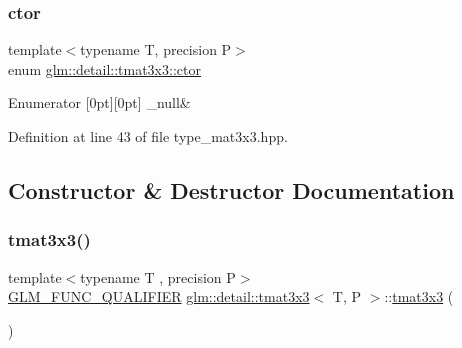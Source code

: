 \subsubsection{\texorpdfstring{ctor}{ctor}}
{\footnotesize\ttfamily template$<$typename T, precision P$>$ \\
enum \hyperlink{structglm_1_1detail_1_1tmat3x3_a24175afa829b47d3cc2a65860b16e103}{glm\+::detail\+::tmat3x3\+::ctor}}

\begin{DoxyEnumFields}{Enumerator}
[0pt][0pt]{}\mbox{\label{structglm_1_1detail_1_1tmat3x3_a24175afa829b47d3cc2a65860b16e103a4b892e336bd2984e872ade90b1464f96}} 
\+\_\+null&\\
\hline

\end{DoxyEnumFields}


Definition at line 43 of file type\+\_\+mat3x3.\+hpp.



\subsection{Constructor \& Destructor Documentation}
\mbox{\label{structglm_1_1detail_1_1tmat3x3_aec60b37bc72ea2b4f90810110b88a0d6}} 
\subsubsection{\texorpdfstring{tmat3x3()}{tmat3x3()}\hspace{0.1cm}{\footnotesize\ttfamily [1/22]}}
{\footnotesize\ttfamily template$<$typename T , precision P$>$ \\
\hyperlink{setup_8hpp_a33fdea6f91c5f834105f7415e2a64407}{G\+L\+M\+\_\+\+F\+U\+N\+C\+\_\+\+Q\+U\+A\+L\+I\+F\+I\+ER} \hyperlink{structglm_1_1detail_1_1tmat3x3}{glm\+::detail\+::tmat3x3}$<$ T, P $>$\+::\hyperlink{structglm_1_1detail_1_1tmat3x3}{tmat3x3} (\begin{DoxyParamCaption}{ }\end{DoxyParamCaption})}



